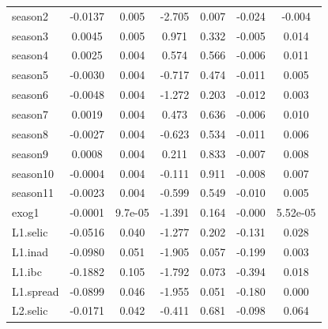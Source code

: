 \documentclass[a4paper,
               article,
               12pt,
               openany,
               oneside,
               english,
               brazil]{abntex2}
\numberwithin{equation}{section}
\begin{document}
\begin{longtable}{lcccccc}
    season2   &      -0.0137  &        0.005     &    -2.705  &         0.007        &       -0.024    &       -0.004     \\
    season3   &       0.0045  &        0.005     &     0.971  &         0.332        &       -0.005    &        0.014     \\
    season4   &       0.0025  &        0.004     &     0.574  &         0.566        &       -0.006    &        0.011     \\
    season5   &      -0.0030  &        0.004     &    -0.717  &         0.474        &       -0.011    &        0.005     \\
    season6   &      -0.0048  &        0.004     &    -1.272  &         0.203        &       -0.012    &        0.003     \\
    season7   &       0.0019  &        0.004     &     0.473  &         0.636        &       -0.006    &        0.010     \\
    season8   &      -0.0027  &        0.004     &    -0.623  &         0.534        &       -0.011    &        0.006     \\
    season9   &       0.0008  &        0.004     &     0.211  &         0.833        &       -0.007    &        0.008     \\
    season10  &      -0.0004  &        0.004     &    -0.111  &         0.911        &       -0.008    &        0.007     \\
    season11  &      -0.0023  &        0.004     &    -0.599  &         0.549        &       -0.010    &        0.005     \\
    exog1     &      -0.0001  &      9.7e-05     &    -1.391  &         0.164        &       -0.000    &     5.52e-05     \\
    L1.selic  &      -0.0516  &        0.040     &    -1.277  &         0.202        &       -0.131    &        0.028     \\
    L1.inad   &      -0.0980  &        0.051     &    -1.905  &         0.057        &       -0.199    &        0.003     \\
    L1.ibc    &      -0.1882  &        0.105     &    -1.792  &         0.073        &       -0.394    &        0.018     \\
    L1.spread &      -0.0899  &        0.046     &    -1.955  &         0.051        &       -0.180    &        0.000     \\
    L2.selic  &      -0.0171  &        0.042     &    -0.411  &         0.681        &       -0.098    &        0.064     \\

\end{longtable}
\end{document}
